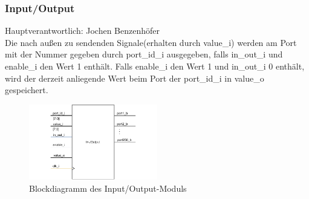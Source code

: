 \documentclass[bibliography=totoc,listof=totoc,index=totoc]{scrartcl}
\begin{document}
\subsubsection{Input/Output}
\begin{multicols}{2}
Hauptverantwortlich: Jochen Benzenhöfer\\
Die nach außen zu sendenden Signale(erhalten durch value\_i) werden am Port mit der Nummer gegeben durch port\_id\_i ausgegeben, falls in\_out\_i und enable\_i den Wert 1 enthält. Falls enable\_i den Wert 1 und in\_out\_i 0 enthält, wird der derzeit anliegende Wert beim Port der port\_id\_i in value\_o gespeichert.
\begin{figure}[H]
    \centering
    \includegraphics[width=0.5\textwidth]{IO_beschreibung.pdf}
    \caption{Blockdiagramm des Input/Output-Moduls}
    \label{fig:Block_IO}
\end{figure}
\end{multicols}

\newpage
\end{document}
